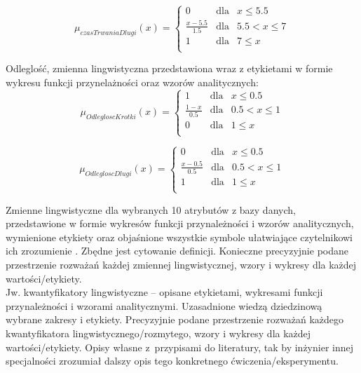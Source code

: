 \documentclass{classrep}
\begin{document}
\begin{equation}
\mu _{czasTrwaniaDlugi}(x) =  \left\{ \begin{array}{rcl}
 0 & \mbox{dla} & x \leq 5.5 \\
\frac{x - 5.5}{1.5} & \mbox{dla} & 5.5 < x \leq 7\\
1 & \mbox{dla} & 7 \leq x\\
\end{array}\right.
\end{equation}


Odleglość, zmienna lingwistyczna przedstawiona wraz z etykietami w formie wykresu funkcji przynelażności oraz wzorów analitycznych:
\begin{equation}
\mu _{OdlegloscKrotki}(x) =  \left\{ \begin{array}{rcl}
 1 & \mbox{dla} & x  \leq 0.5 \\
\frac{1 - x}{0.5} & \mbox{dla} & 0.5 < x \leq 1\\
0 & \mbox{dla} & 1 \leq x\\
\end{array}\right.
\end{equation}

\begin{equation}
\mu _{OdlegloscDlugi}(x) =  \left\{ \begin{array}{rcl}
 0 & \mbox{dla} & x \leq 0.5 \\
\frac{x - 0.5}{0.5} & \mbox{dla} & 0.5 < x \leq 1\\
1 & \mbox{dla} & 1 \leq x\\
\end{array}\right.
\end{equation}


Zmienne lingwistyczne dla wybranych 10 atrybutów z bazy danych, przedstawione w
formie wykresów funkcji przynależności i wzorów analitycznych, wymienione etykiety oraz objaśnione wszystkie
symbole ułatwiające czytelnikowi ich zrozumienie \cite{zadrozny06}. Zbędne jest
cytowanie definicji. Konieczne precyzyjnie podane przestrzenie rozważań każdej
zmiennej lingwistycznej, wzory i wykresy dla każdej wartości/etykiety.\\
Jw. kwantyfikatory lingwistyczne -- opisane etykietami, wykresami funkcji
przynależności i wzorami analitycznymi. Uzasadnione wiedzą dziedzinową wybrane
zakresy i etykiety. Precyzyjnie podane przestrzenie rozważań każdego kwantyfikatora 
lingwistycznego/rozmytego, wzory i wykresy dla każdej wartości/etykiety. Opisy własne z~przypisami do literatury, tak by inżynier innej specjalności zrozumiał dalszy
opis tego konkretnego ćwiczenia/eksperymentu. \\ 
\end{document}
